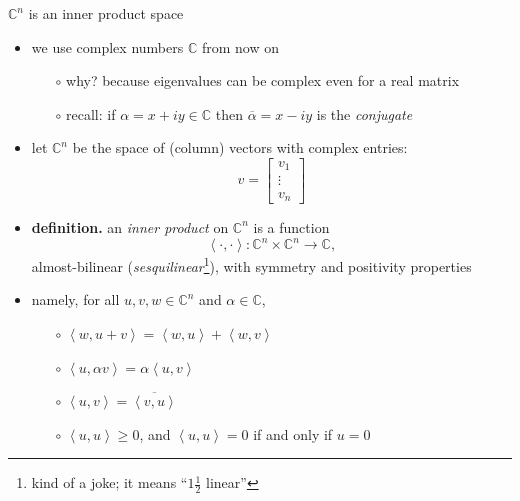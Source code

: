 \documentclass[10pt,hyperref]{beamer}
\newcommand{\CC}{\mathbb{C}}
\newcommand{\ip}[2]{\left<#1,#2\right>}
\begin{document}
\begin{frame}{$\CC^n$ is an inner product space}

\begin{itemize}
\item we use complex numbers $\CC$ from now on
    \begin{itemize}
    \item[$\circ$] why? because eigenvalues can be complex even for a real matrix
    \item[$\circ$] recall: if $\alpha=x+iy \in \CC$ then $\overline{\alpha} = x-iy$ is the \emph{conjugate}
    \end{itemize}
\item let $\CC^n$ be the space of (column) vectors with complex entries:
\footnotesize
    $$v = \begin{bmatrix}
    v_1 \\ \vdots \\ v_n
    \end{bmatrix}$$
\normalsize
\vspace{-2mm}
\item \textbf{definition.} an \emph{inner product} on $\CC^n$ is a function
    $$\ip{\cdot}{\cdot}:\CC^n\times \CC^n \to \CC,$$
almost-bilinear (\emph{sesquilinear}\footnote{kind of a joke; it means ``$1\frac{1}{2}$ linear''}), with symmetry and positivity properties
\item namely, for all $u,v,w \in \CC^n$ and $\alpha\in \CC$,
    \begin{itemize}
    \item[$\circ$] $\ip{w}{u+v} = \ip{w}{u} + \ip{w}{v}$
    \item[$\circ$] $\ip{u}{\alpha v} = \alpha \ip{u}{v}$
    \item[$\circ$] $\ip{u}{v} = \overline{\ip{v}{u}}$
    \item[$\circ$] $\ip{u}{u} \ge 0$, and $\ip{u}{u}=0$ if and only if $u=0$
    \end{itemize}
\end{itemize}
\end{frame}
\end{document}
